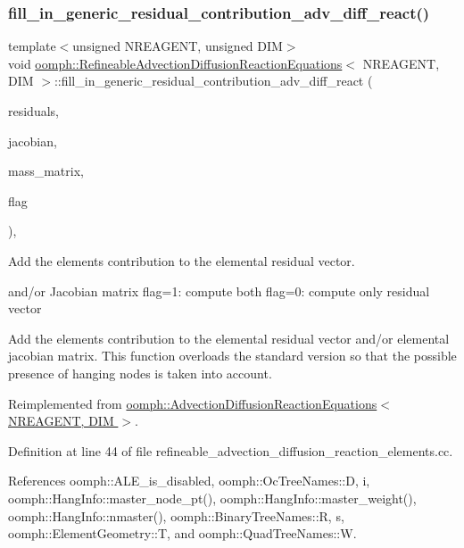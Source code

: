\subsubsection{\texorpdfstring{fill\+\_\+in\+\_\+generic\+\_\+residual\+\_\+contribution\+\_\+adv\+\_\+diff\+\_\+react()}{fill\_in\_generic\_residual\_contribution\_adv\_diff\_react()}}
{\footnotesize\ttfamily template$<$unsigned N\+R\+E\+A\+G\+E\+NT, unsigned D\+IM$>$ \\
void \hyperlink{classoomph_1_1RefineableAdvectionDiffusionReactionEquations}{oomph\+::\+Refineable\+Advection\+Diffusion\+Reaction\+Equations}$<$ N\+R\+E\+A\+G\+E\+NT, D\+IM $>$\+::fill\+\_\+in\+\_\+generic\+\_\+residual\+\_\+contribution\+\_\+adv\+\_\+diff\+\_\+react (\begin{DoxyParamCaption}\item[{\hyperlink{classoomph_1_1Vector}{Vector}$<$ double $>$ \&}]{residuals,  }\item[{\hyperlink{classoomph_1_1DenseMatrix}{Dense\+Matrix}$<$ double $>$ \&}]{jacobian,  }\item[{\hyperlink{classoomph_1_1DenseMatrix}{Dense\+Matrix}$<$ double $>$ \&}]{mass\+\_\+matrix,  }\item[{unsigned}]{flag }\end{DoxyParamCaption})\hspace{0.3cm}{\ttfamily [protected]}, {\ttfamily [virtual]}}



Add the element\textquotesingle{}s contribution to the elemental residual vector. 

and/or Jacobian matrix flag=1\+: compute both flag=0\+: compute only residual vector

Add the element\textquotesingle{}s contribution to the elemental residual vector and/or elemental jacobian matrix. This function overloads the standard version so that the possible presence of hanging nodes is taken into account. 

Reimplemented from \hyperlink{classoomph_1_1AdvectionDiffusionReactionEquations_a66d61f635f3d733b5e70de9552cdaf6b}{oomph\+::\+Advection\+Diffusion\+Reaction\+Equations$<$ N\+R\+E\+A\+G\+E\+N\+T, D\+I\+M $>$}.



Definition at line 44 of file refineable\+\_\+advection\+\_\+diffusion\+\_\+reaction\+\_\+elements.\+cc.



References oomph\+::\+A\+L\+E\+\_\+is\+\_\+disabled, oomph\+::\+Oc\+Tree\+Names\+::D, i, oomph\+::\+Hang\+Info\+::master\+\_\+node\+\_\+pt(), oomph\+::\+Hang\+Info\+::master\+\_\+weight(), oomph\+::\+Hang\+Info\+::nmaster(), oomph\+::\+Binary\+Tree\+Names\+::R, s, oomph\+::\+Element\+Geometry\+::T, and oomph\+::\+Quad\+Tree\+Names\+::W.



